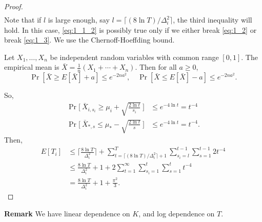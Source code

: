 \begin{proof}
\begin{align}
    \end{align}
    Note that if $l$ is large enough,
    say $l=\lceil (8\ln T)/\Delta_i^2\rceil$,
    the third inequality will hold.
    In this case,
    \eqref{eq:1_1_2} is possibly true only if we either break \eqref{eq:1_2} or break \eqref{eq:1_3}.
    We use the Chernoff-Hoeffding bound.
    \begin{framed}
        \begin{fact}
            Let $X_1, \dots, X_n$ be independent random variables with common range $[0,1]$.
            The empirical mean is $\bar X=\frac{1}{n}(X_1+\cdots+ X_n)$.
            Then for all $a\ge0$,
            \begin{equation}
                \Pr[\bar X\ge E[\bar X] + a] \le e^{-2na^2}, \quad
                \Pr[\bar X\le E[\bar X] - a] \le e^{-2na^2}.
            \end{equation}
        \end{fact}
    \end{framed}
    So,
    \begin{align}
        \Pr\Bigg[~\bar X_{i,s_i} \ge \mu_i + \sqrt{\frac{2\ln t}{s_i}}~\Bigg]
            &\le e^{-4\ln t} = t^{-4} \\
        \Pr\Bigg[~\bar X_{*,s} \le \mu_* - \sqrt{\frac{2\ln t}{s}}~\Bigg]
            &\le e^{-4\ln t} = t^{-4}.
    \end{align}
    Then,
    \begin{align}
        E[T_i]
            &\le \bigg\lceil \frac{8\ln T}{\Delta_i^2}\bigg\rceil +
            \sum_{t=\lceil (8\ln T)/\Delta_i^2\rceil+1}^T
            \sum_{s_i=l}^{t-1} \sum_{s=1}^{t-1}
            2t^{-4} \\
            &\le \frac{8\ln T}{\Delta_i^2} + 1 +
            2\sum_{t=1}^\infty \sum_{s_i=1}^{t} \sum_{s=1}^{t}t^{-4} \\
            &= \frac{8\ln T}{\Delta_i^2} + 1 + \frac{\pi^2}{3}.
    \end{align}
\end{proof}

\textbf{Remark}
We have linear dependence on $K$,
and log dependence on $T$.
